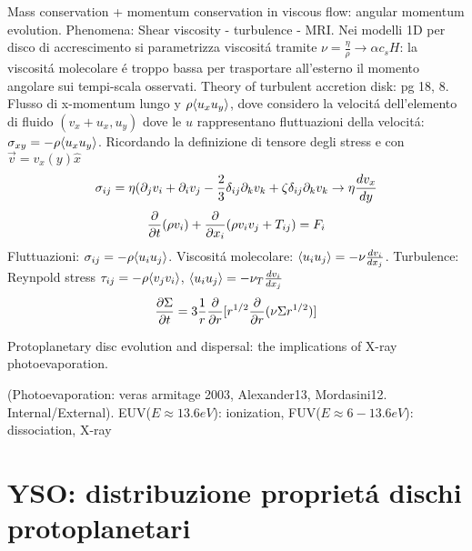 \begin{workout}
\begin{workout}
Mass conservation + momentum conservation in viscous flow: angular momentum evolution. Phenomena: Shear viscosity - turbulence - MRI.
Nei modelli 1D per disco di accrescimento si parametrizza viscosit\'a tramite $\nu=\frac{\eta}{\rho}\to\alpha c_s H$: la viscosit\'a molecolare \'e troppo bassa  per trasportare all'esterno il momento angolare sui tempi-scala osservati.
Theory of turbulent accretion disk: pg 18, 8.
Flusso di x-momentum lungo y $\rho\exv{u_xu_y}$, dove considero la velocit\'a dell'elemento di fluido $(v_x+u_x,u_y)$ dove le $u$ rappresentano fluttuazioni della velocit\'a: $\sigma_{xy}=-\rho\exv{u_xu_y}$.
Ricordando la definizione di tensore degli stress e con $\vec{v}=v_x(y)\hat{x}$
\begin{equation}
\sigma_{ij}=\eta(\partial_jv_i+\partial_iv_j-\frac{2}{3}\delta_{ij}\partial_kv_k+\zeta\delta_{ij}\partial_kv_k \to \eta\TDy{y}{v_x}
\end{equation}
\begin{equation}
\PDof{t}(\rho v_i)+\PDof{x_i}(\rho v_iv_j+T_{ij})=F_i
\end{equation}
Fluttuazioni: $\sigma_{ij}=-\rho\exv{u_iu_j}$.
Viscosit\'a molecolare: $\exv{u_iu_j}=-\nu\TDy{x_j}{v_i}$.
Turbulence: Reynpold stress $\tau_{ij}=-\rho\exv{v_jv_i}$, $\exv{u_iu_j}=-\nu_T\TDy{x_j}{v_i}$
\begin{equation}
\PDy{t}{\Sigma}=3\frac{1}{r}\PDof{r}[r\expy{1/2}\PDof{r}(\nu\Sigma r\expy{1/2})]
\end{equation}
\end{workout}

\begin{workout}
Protoplanetary disc evolution and dispersal: the implications of X-ray photoevaporation.
\end{workout}


\begin{workout}
(Photoevaporation: veras armitage 2003, Alexander13, Mordasini12. Internal/External).
EUV($E\approx13.6eV$): ionization, FUV($E\approx6-13.6eV$): dissociation, X-ray
\end{workout}

\section{YSO: distribuzione propriet\'a dischi protoplanetari}


\end{workout}
